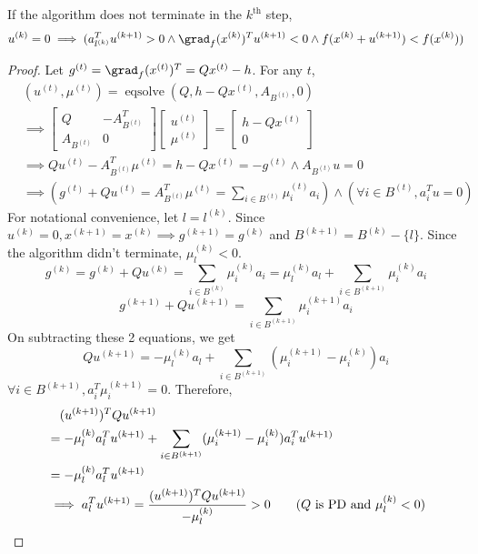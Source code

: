 \begin{lemma}
If the algorithm does not terminate in the $k^{\textrm{th}}$ step,
\[ u^{(k)} = 0 \implies (a_{l^{(k)}}^Tu^{(k+1)} > 0
\wedge \grad_f(x^{(k)})^Tu^{(k+1)} < 0 \wedge f(x^{(k)} + u^{(k+1)}) < f(x^{(k)})) \]
\end{lemma}
\begin{proof}
Let $g^{(t)} = \grad_f(x^{(t)})^T = Qx^{(t)} - h$. For any $t$,
\begin{align*}
& (u^{(t)}, \mu^{(t)}) = \operatorname{eqsolve}(Q, h - Qx^{(t)}, A_{B^{(t)}}, 0)
\\ &\implies \begin{bmatrix} Q & -A_{B^{(t)}}^T \\ A_{B^{(t)}} & 0 \end{bmatrix}
\begin{bmatrix} u^{(t)} \\ \mu^{(t)} \end{bmatrix}
= \begin{bmatrix} h - Qx^{(t)} \\ 0 \end{bmatrix}
\\ &\implies Qu^{(t)} - A_{B^{(t)}}^T\mu^{(t)} = h - Qx^{(t)} = -g^{(t)} \wedge A_{B^{(t)}}u = 0
\\ &\implies \left( g^{(t)} + Qu^{(t)} = A_{B^{(t)}}^T\mu^{(t)} = \sum_{i \in B^{(t)}} \mu^{(t)}_ia_i \right)
\wedge (\forall i \in B^{(t)}, a_i^Tu = 0)
\end{align*}
For notational convenience, let $l = l^{(k)}$.
Since $u^{(k)} = 0, x^{(k+1)} = x^{(k)} \implies g^{(k+1)} = g^{(k)}$ and $B^{(k+1)} = B^{(k)} - \{l\}$.
Since the algorithm didn't terminate, $\mu^{(k)}_l < 0$.
\[ g^{(k)} = g^{(k)} + Qu^{(k)} = \sum_{i \in B^{(k)}} \mu_i^{(k)}a_i
= \mu_l^{(k)}a_l + \sum_{i \in B^{(k+1)}} \mu_i^{(k)}a_i \]
\[ g^{(k+1)} + Qu^{(k+1)} = \sum_{i \in B^{(k+1)}} \mu_i^{(k+1)}a_i \]
On subtracting these 2 equations, we get
\[ Qu^{(k+1)} = -\mu^{(k)}_la_l + \sum_{i \in B^{(k+1)}} (\mu^{(k+1)}_i - \mu^{(k)}_i)a_i \]
$\forall i \in B^{(k+1)}, a_i^T\mu^{(k+1)}_i = 0$. Therefore,
\begin{align*}
& \quad (u^{(k+1)})^TQu^{(k+1)}
\\ &= -\mu^{(k)}_l a_l^Tu^{(k+1)} + \sum_{i \in B^{(k+1)}} (\mu^{(k+1)}_i - \mu^{(k)}_i)a_i^Tu^{(k+1)}
\\ &= -\mu^{(k)}_l a_l^Tu^{(k+1)}
\\ &\implies a_l^Tu^{(k+1)} = \frac{(u^{(k+1)})^TQu^{(k+1)}}{-\mu^{(k)}_l} > 0
\tag{$Q$ is PD and $\mu^{(k)}_l < 0$}
\end{align*}

\end{proof}
